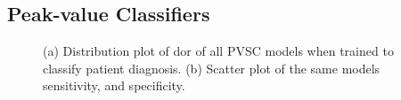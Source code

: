 \newpage

\subsection{Peak-value Classifiers}

\begin{figure}[H]
    \centering
    
    \caption{(a) Distribution plot of \acrshort{dor} of all PVSC models when trained to classify patient diagnosis.
             (b) Scatter plot of the same models sensitivity, and specificity.}
    \label{fig:pvmlc_ind_dor_sens_spec_dist}
\end{figure}

